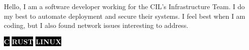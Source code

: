 \documentclass[10pt]{developercv} %
\begin{document}
\vspace{0.5cm}



\hspace{6pt}\begin{minipage}[t]{0.98\textwidth} %
	\vspace{-\baselineskip} %

	{Hello, I am a software developer working for the CIL's Infrastructure Team. I do my best to automate deployment and secure their systems. I feel best when I am coding, but I also found network issues interesting to address.} %

\end{minipage}
\hfill %


\begin{center}
	\colorbox{black}{{\textcolor{white}{\textbf{\MakeUppercase{C}}}}}
	\colorbox{black}{{\textcolor{white}{\textbf{\MakeUppercase{Rust}}}}}
	\colorbox{black}{{\textcolor{white}{\textbf{\MakeUppercase{Linux}}}}}
\end{center}


\end{document}
